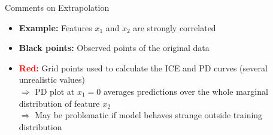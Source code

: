 \documentclass[11pt,compress,t,notes=noshow, aspectratio=169, xcolor=table]{beamer}
\begin{document}
\begin{frame}{Comments on Extrapolation}
\begin{itemize}
\item \textbf{Example:} Features $x_1$ and $x_2$ are strongly correlated
\item \textbf{Black points:} Observed points of the original data
\item \textbf{\textcolor{red}{Red:}} Grid points used to calculate the ICE and PD curves (several unrealistic values)\\ %
$\Rightarrow$ %
PD plot at $x_1=0$ averages predictions over the whole marginal distribution of feature $x_2$\\
$\Rightarrow$ May be problematic if model behaves strange outside training distribution
\end{itemize}

%
%
%
%
\end{frame}
\end{document}
